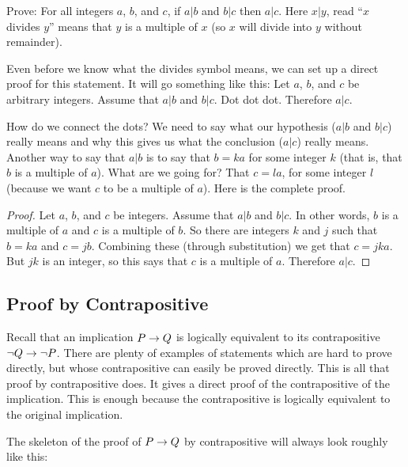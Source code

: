 \documentclass[12pt]{article}
\begin{document}
 
\begin{example}
Prove: For all integers $a$, $b$, and $c$, if $a|b$ and $b|c$ then $a|c$.  Here $x|y$, read ``$x$ divides $y$'' means that $y$ is a multiple of $x$ (so $x$ will divide into $y$ without remainder).

\begin{solution}
Even before we know what the divides symbol means, we can set up a direct proof for this statement.  It will go something like this: Let $a$, $b$, and $c$ be arbitrary integers.  Assume that $a|b$ and $b|c$.  Dot dot dot.  Therefore $a|c$.

How do we connect the dots?  We need to say what our hypothesis ($a|b$ and $b|c$) really means and why this gives us what the conclusion ($a|c$) really means.  Another way to say that $a|b$ is to say that $b = ka$ for some integer $k$ (that is, that $b$ is a multiple of $a$).  What are we going for?  That $c = la$, for some integer $l$ (because we want $c$ to be a multiple of $a$).  Here is the complete proof.

\begin{proof}
Let $a$, $b$, and $c$ be integers.  Assume that $a|b$ and $b|c$.  In other words, $b$ is a multiple of $a$ and $c$ is a multiple of $b$.  So there are integers $k$ and $j$ such that $b = ka$ and $c = jb$.  Combining these (through substitution) we get that $c = jka$.  But $jk$ is an integer, so this says that $c$ is a multiple of $a$.  Therefore $a|c$.
\end{proof}
\end{solution}
\end{example} 
 
 

\subsection*{Proof by Contrapositive}

Recall that an implication $P \rightarrow Q$ is logically equivalent to its contrapositive $\neg Q \rightarrow \neg P$.  There are plenty of examples of statements which are hard to prove directly, but whose contrapositive can easily be proved directly.  This is all that proof by contrapositive does.  It gives a direct proof of the contrapositive of the implication.  This is enough because the contrapositive is logically equivalent to the original implication.

The skeleton of the proof of $P \rightarrow Q$ by contrapositive will always look roughly like this:
\end{document}
